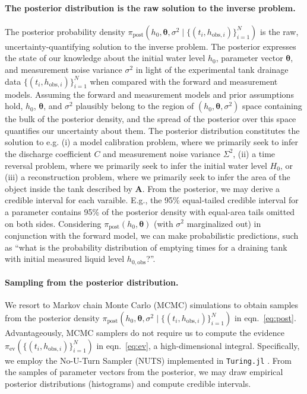 \documentclass[openacc]{rsproca_new}%
\newcommand\thedata {$\{(t_i,h_{\text{obs}, i})\}_{i=1}^{N}$\xspace}
\newcommand\thedatanomath {\{(t_i,h_{\text{obs}, i})\}_{i=1}^{N}}
\begin{document}
\paragraph{The posterior distribution is the raw solution to the inverse problem.}
The posterior probability density $\pi_{\text{post}}(h_0, \boldsymbol \theta, \sigma^2 \mid \thedatanomath)$ is the raw, uncertainty-quantifying solution to the inverse problem.
The posterior expresses the state of our knowledge about the initial water level $h_0$, parameter vector $\boldsymbol \theta$, and measurement noise variance $\sigma^2$ in light of the experimental tank drainage data \thedata when compared with the forward and measurement models. 
Assuming the forward and measurement models and prior assumptions hold, $h_0$, $\boldsymbol \theta$, and $\sigma^2$ plausibly belong to the region of $(h_0, \boldsymbol \theta, \sigma^2)$ space containing the bulk of the posterior density, and the spread of the posterior over this space quantifies our uncertainty about them.
The posterior distribution constitutes the solution to e.g. (i) a model calibration problem, where we primarily seek to infer the discharge coefficient $C$ and measurement noise variance $\Sigma^2$, (ii) a time reversal problem, where we primarily seek to infer the initial water level $H_0$, or (iii) a reconstruction problem, where we primarily seek to infer the area of the object inside the tank described by $\mathbf{A}$. 
From the posterior, we may derive a credible interval for each varaible. E.g., the 95\% equal-tailed credible interval for a parameter contains 95\% of the posterior density with equal-area tails omitted on both sides. 
Considering $\pi_{\text{post}}(h_0, \boldsymbol\theta)$ (with $\sigma^2$ marginalized out) in conjunction with the forward model, we can make probabilistic predictions, such as ``what is the probability distribution of emptying times for a draining tank with initial measured liquid level $h_{0, \text{obs}}$?''.

\paragraph{Sampling from the posterior distribution.} We resort to Markov chain Monte Carlo (MCMC) simulations \cite{robert1999monte} to obtain samples from the posterior density $\pi_{\text{post}}(h_0, \boldsymbol \theta, \sigma^2 \mid \thedatanomath)$ in eqn.~\ref{eq:post}. Advantageously, MCMC samplers do not require us to compute the evidence $\pi_{\text{ev}}(\thedatanomath)$ in eqn.~\ref{eq:ev}, a high-dimensional integral. Specifically, we employ the No-U-Turn Sampler (NUTS) \cite{hoffman2014no} implemented in \texttt{Turing.jl} \cite{ge2018turing}. From the samples of parameter vectors from the posterior, we may draw empirical posterior distributions (histograms) and compute credible intervals.
\end{document}

